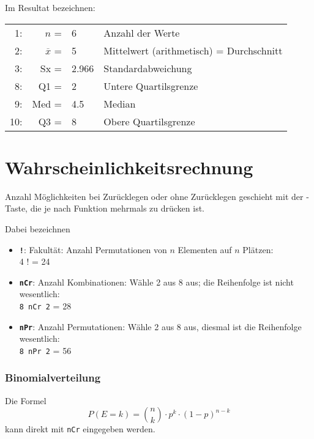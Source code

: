 Im Resultat bezeichnen:

\begin{tabular}{r|r l|p{9cm}}
 1: & $n$            = & 6     & Anzahl der Werte\\
 2: & $\overline{x}$ = & 5     & Mittelwert (arithmetisch) = Durchschnitt\\
 3: & Sx             = & 2.966 & Standardabweichung \\
 8: & Q1             = & 2     & Untere Quartilsgrenze \\
 9: & Med            = & 4.5   & Median \\
10: & Q3             = & 8     & Obere Quartilsgrenze \\


\end{tabular}
\newpage

\section{Wahrscheinlichkeitsrechnung}\label{wahrscheinlichkeitsrechnung}
Anzahl Möglichkeiten bei Zurücklegen oder ohne Zurücklegen geschieht mit der -Taste, die je nach Funktion mehrmals zu drücken ist. 

Dabei bezeichnen

\begin{itemize}
\item \texttt{\textbf{!}}: Fakultät: Anzahl Permutationen von $n$ Elementen auf $n$ Plätzen:\\
4 ! = 24

\item \texttt{\textbf{nCr}}: Anzahl Kombinationen: Wähle 2 aus 8 aus; die Reihenfolge ist nicht wesentlich:\\
\texttt{8 nCr 2} = 28

\item \texttt{\textbf{nPr}}: Anzahl Permutationen: Wähle 2 aus 8 aus, diesmal ist die Reihenfolge wesentlich:\\
\texttt{8 nPr 2} = 56
\end{itemize}

\subsubsection{Binomialverteilung}
Die Formel
$$P(E = k) = {n \choose k}\cdot{}p^k\cdot{}(1-p)^{n-k}$$
kann direkt mit \texttt{nCr} eingegeben werden.

